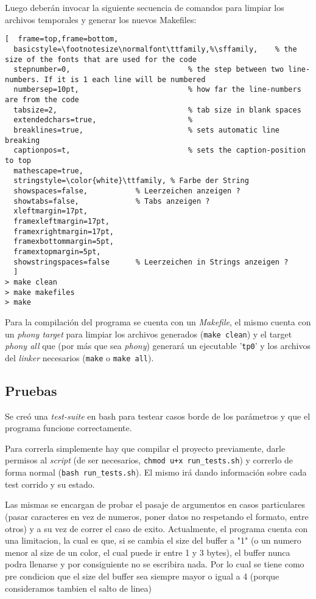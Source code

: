 \documentclass[10pt,a4paper]{article}
\begin{document}
Luego deberán invocar la siguiente secuencia de comandos para limpiar los archivos temporales
y generar los nuevos Makefiles:
\begin{lstlisting}[  frame=top,frame=bottom,
  basicstyle=\footnotesize\normalfont\ttfamily,%\sffamily,    % the size of the fonts that are used for the code
  stepnumber=0,                           % the step between two line-numbers. If it is 1 each line will be numbered
  numbersep=10pt,                         % how far the line-numbers are from the code
  tabsize=2,                              % tab size in blank spaces
  extendedchars=true,                     %
  breaklines=true,                        % sets automatic line breaking
  captionpos=t,                           % sets the caption-position to top
  mathescape=true,
  stringstyle=\color{white}\ttfamily, % Farbe der String
  showspaces=false,           % Leerzeichen anzeigen ?
  showtabs=false,             % Tabs anzeigen ?
  xleftmargin=17pt,
  framexleftmargin=17pt,
  framexrightmargin=17pt,
  framexbottommargin=5pt,
  framextopmargin=5pt,
  showstringspaces=false      % Leerzeichen in Strings anzeigen ?
  ]
> make clean
> make makefiles
> make

\end{lstlisting}

Para la compilación del programa se cuenta con un \textit{Makefile}, el mismo cuenta con un\textit{ phony target} para limpiar los archivos generados (\texttt{make clean}) y el target \textit{phony all} que (por más que sea \textit{phony}) generará un ejecutable '\texttt{tp0}' y los archivos del \textit{linker} necesarios (\texttt{make} o \texttt{make all}).

\subsection{Pruebas}

Se creó una \textit{test-suite} en bash para testear casos borde de los parámetros y que el programa funcione correctamente. 

Para correrla simplemente hay que compilar el proyecto previamente, darle permisos al \textit{script} (de ser necesarios, \texttt{chmod u+x run\_tests.sh}) y correrlo de forma normal (\texttt{bash run\_tests.sh}). El mismo irá dando información sobre cada test corrido y su estado.

Las mismas se encargan de probar el pasaje de argumentos en casos particulares (pasar caracteres en vez de numeros, poner datos no respetando el formato, entre otros) y a su vez de correr el caso de exito. Actualmente, el programa cuenta con una limitacion, la cual es que, si se cambia el size del buffer a "1" (o un numero menor al size de un color, el cual puede ir entre 1 y 3 bytes), el buffer nunca podra llenarse y por consiguiente no se escribira nada. Por lo cual se tiene como pre condicion que el size del buffer sea siempre mayor o igual a 4 (porque consideramos tambien el salto de linea)
\end{document}
